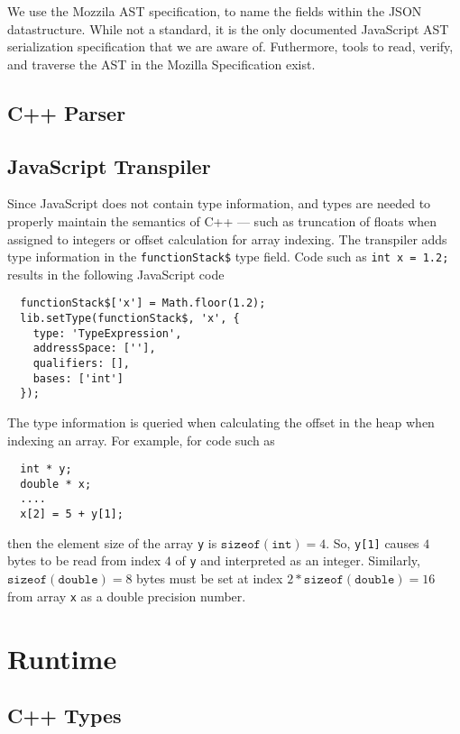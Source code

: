 \documentclass[nocopyrightspace]{sigchi}
\begin{document}
We use the Mozzila AST specification, to name the fields within the JSON datastructure.
While not a standard, it is the only documented JavaScript AST serialization specification
that we are aware of. Futhermore, tools to read, verify, and traverse the AST in the
Mozilla Specification exist.



\subsection{C++ Parser}

\subsection{JavaScript Transpiler}


Since JavaScript does not contain type information, and types are needed to
properly maintain the semantics of C++ --- such as truncation of floats when
assigned to integers or offset calculation for array indexing. The transpiler
adds type information in the {\tt functionStack\$} type field. Code such as
{\tt int x = 1.2;} results in the following JavaScript code

\begin{verbatim}
  functionStack$['x'] = Math.floor(1.2);
  lib.setType(functionStack$, 'x', {
    type: 'TypeExpression',
    addressSpace: [''],
    qualifiers: [],
    bases: ['int']
  });
\end{verbatim}

The type information is queried when calculating the offset in the heap when
indexing an array. For example, for code such as

\begin{verbatim}
  int * y;
  double * x;
  ....
  x[2] = 5 + y[1];
\end{verbatim}

then the element size of the array {\tt y} is $\mathtt{sizeof(int)} = 4$.
So, {\tt y[1]} causes $4$ bytes to be read from index $4$ of {\tt y} and
interpreted as an integer. Similarly, $\mathtt{sizeof(double)} = 8$ bytes
must be set at index $2 * \mathtt{sizeof(double)} = 16$ from array {\tt x}
as a double precision number.

\section{Runtime}


\subsection{C++ Types}
\end{document}
